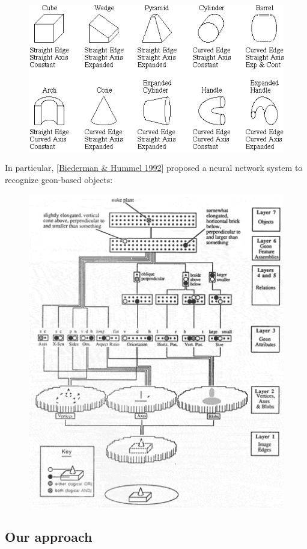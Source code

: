 \begin{figure}[H]
\centering
\includegraphics[scale=0.7]{geons.PNG}
\end{figure}

In particular, [\hyperlink{ref}{Biederman \& Hummel 1992}] proposed a neural network system to recognize geon-based objects:

\begin{figure}[H]
\centering
\includegraphics[scale=0.6]{BiedermanHummelNN.PNG}
\end{figure}

\subsection{Our approach}

